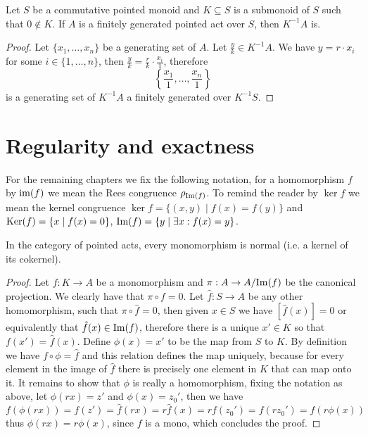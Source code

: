 \begin{proposition}
    Let $S$ be a commutative pointed monoid and $K\subseteq S$ is a submonoid of $S$ such that $0\not\in K$.
    If $A$ is a finitely generated pointed act over $S$, then $K^{-1} A$ is.
\end{proposition}
\begin{proof}
    Let $\{x_1,\dots,x_n\}$ be a generating set of $A$. Let $\frac{y}{k}\in K^{-1} A$. We have $y=r\cdot x_i$ for some $i\in\{1,\dots, n\}$,
    then $\frac{y}{k} = \frac{r}{k}\cdot\frac{x_i}{1}$, therefore 
    \[
        \left\{\frac{x_1}{1},\dots,\frac{x_n}{1}\right\}
    \]
    is a generating set of $K^{-1} A$ a finitely generated over $K^{-1}S$.
\end{proof}
\section{Regularity and exactness}
    For the remaining chapters we fix the following notation, for a homomorphism $f$ by $\text{im}(f)$ we mean the 
    Rees congruence $\rho_{\mathrm{Im}(f)}$. To remind the reader by $\ker{f}$ we mean the kernel congruence $\ker{f} = \{(x,y) \mid f(x)=f(y)\}$
    and $\mathrm{Ker}(f) = \{x \mid f(x) = 0\}$, $\mathrm{Im}(f) = \{ y \mid \exists x : f(x) =y \}$.
\begin{proposition}
    In the category of pointed acts, every monomorphism is normal (i.e. a kernel of its cokernel). 
\end{proposition}
\begin{proof}[Proof]
    Let $f: K \to A$ be a monomorphism and $\pi : A \to A/\mathrm{Im}(f)$ be the canonical projection. We clearly have that 
    $\pi\circ f = 0$. Let $\hat{f} : S \to A$ be any other homomorphism, such that $\pi\circ\hat{f} = 0$, then 
    given $x\in S$ we have $[\hat{f}(x)]=0$ or equivalently that $\hat{f}(x)\in\mathrm{Im}(f)$, therefore there is a unique 
    $x'\in K$ so that $f(x')=\hat{f}(x)$. Define $\phi(x)=x'$ to be the map from $S$ to $K$. By definition we have 
    $f\circ\phi = \hat{f}$ and this relation defines the map uniquely, because for every element in the image of $\hat{f}$ there 
    is precisely one element in $K$ that can map onto it. It remains to show that $\phi$ is really a homomorphism, fixing the 
    notation as above, let $\phi(rx)=z'$ and $\phi(x)=z_0'$, then we have 
    \[
        f(\phi(rx))=f(z')=\hat{f}(rx)=r\hat{f}(x)=rf(z_0')=f(rz_0')=f(r\phi(x))
    \]
    thus $\phi(rx)=r\phi(x)$, since $f$ is a mono, which concludes the proof.
\end{proof}

